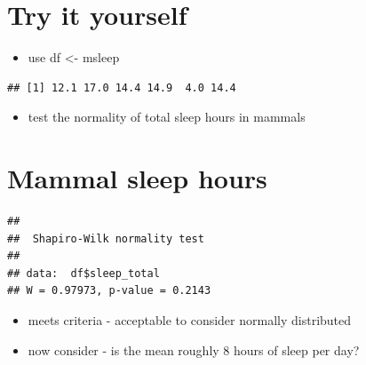\documentclass[
]{book}
\newenvironment{Shaded}{\begin{snugshade}}{\end{snugshade}}
\newcommand{\KeywordTok}[1]{\textcolor[rgb]{0.13,0.29,0.53}{\textbf{#1}}}
\newcommand{\NormalTok}[1]{#1}
\newcommand{\OperatorTok}[1]{\textcolor[rgb]{0.81,0.36,0.00}{\textbf{#1}}}
\newcommand{\StringTok}[1]{\textcolor[rgb]{0.31,0.60,0.02}{#1}}
\providecommand{\tightlist}{%
  \setlength{\itemsep}{0pt}\setlength{\parskip}{0pt}}
\begin{document}
\hypertarget{try-it-yourself}{%
\section{Try it yourself}\label{try-it-yourself}}

\begin{itemize}
\tightlist
\item
  use df \textless- msleep
\end{itemize}

\begin{Shaded}
\end{Shaded}

\begin{verbatim}
## [1] 12.1 17.0 14.4 14.9  4.0 14.4
\end{verbatim}

\begin{itemize}
\tightlist
\item
  test the normality of total sleep hours in mammals
\end{itemize}

\hypertarget{mammal-sleep-hours}{%
\section{Mammal sleep hours}\label{mammal-sleep-hours}}

\begin{Shaded}
\end{Shaded}

\begin{verbatim}
## 
##  Shapiro-Wilk normality test
## 
## data:  df$sleep_total
## W = 0.97973, p-value = 0.2143
\end{verbatim}

\begin{itemize}
\tightlist
\item
  meets criteria - acceptable to consider normally distributed
\item
  now consider - is the mean roughly 8 hours of sleep per day?
\end{itemize}
\end{document}
